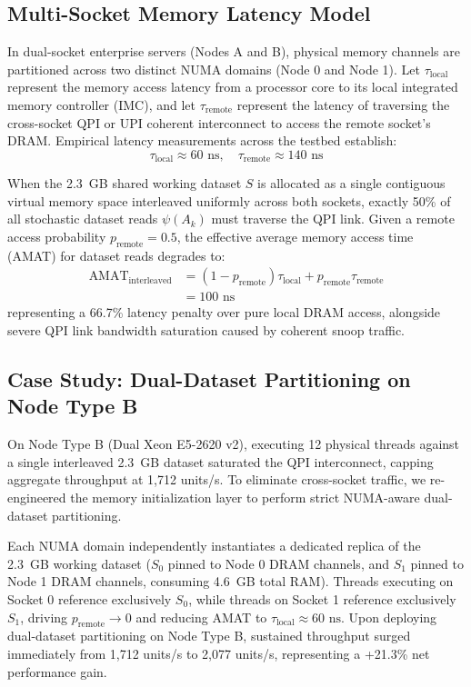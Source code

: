 \documentclass[journal]{IEEEtran}
\begin{document}
\subsection{Multi-Socket Memory Latency Model}
In dual-socket enterprise servers (Nodes A and B), physical memory channels are partitioned across two distinct NUMA domains (Node 0 and Node 1). Let $\tau_{\text{local}}$ represent the memory access latency from a processor core to its local integrated memory controller (IMC), and let $\tau_{\text{remote}}$ represent the latency of traversing the cross-socket QPI or UPI coherent interconnect to access the remote socket's DRAM. Empirical latency measurements across the testbed establish:
\begin{equation}
\tau_{\text{local}} \approx 60\text{ ns}, \quad \tau_{\text{remote}} \approx 140\text{ ns}
\end{equation}

When the 2.3~GB shared working dataset $S$ is allocated as a single contiguous virtual memory space interleaved uniformly across both sockets, exactly 50\% of all stochastic dataset reads $\psi(A_k)$ must traverse the QPI link. Given a remote access probability $p_{\text{remote}} = 0.5$, the effective average memory access time (AMAT) for dataset reads degrades to:
\begin{align}
\text{AMAT}_{\text{interleaved}} &= (1 - p_{\text{remote}})\tau_{\text{local}} + p_{\text{remote}}\tau_{\text{remote}} \nonumber \\
&= 100\text{ ns}
\end{align}
representing a 66.7\% latency penalty over pure local DRAM access, alongside severe QPI link bandwidth saturation caused by coherent snoop traffic.

\subsection{Case Study: Dual-Dataset Partitioning on Node Type B}
On Node Type B (Dual Xeon E5-2620 v2), executing 12 physical threads against a single interleaved 2.3~GB dataset saturated the QPI interconnect, capping aggregate throughput at 1,712 units/s. To eliminate cross-socket traffic, we re-engineered the memory initialization layer to perform strict NUMA-aware dual-dataset partitioning.

Each NUMA domain independently instantiates a dedicated replica of the 2.3~GB working dataset ($S_0$ pinned to Node 0 DRAM channels, and $S_1$ pinned to Node 1 DRAM channels, consuming 4.6~GB total RAM). Threads executing on Socket 0 reference exclusively $S_0$, while threads on Socket 1 reference exclusively $S_1$, driving $p_{\text{remote}} \to 0$ and reducing AMAT to $\tau_{\text{local}} \approx 60\text{ ns}$. Upon deploying dual-dataset partitioning on Node Type B, sustained throughput surged immediately from 1,712 units/s to 2,077 units/s, representing a +21.3\% net performance gain.
\end{document}
